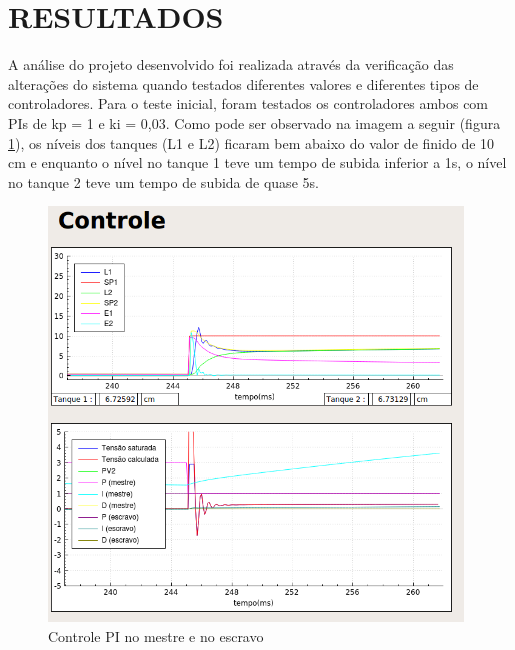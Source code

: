 \documentclass[a4paper,12pt]{article}
\begin{document}
\newpage


\thispagestyle{main}

\section{RESULTADOS}

\hspace{4ex}A análise do projeto desenvolvido foi realizada através da verificação das alterações do sistema quando testados diferentes valores e diferentes tipos de controladores.
Para o teste inicial, foram testados os controladores ambos com PIs de kp = 1 e ki = 0,03. Como pode ser observado na imagem a seguir (figura \ref{img1}), os níveis dos tanques (L1 e L2) ficaram bem abaixo do valor de finido de 10 cm e enquanto o nível no tanque 1 teve um tempo de subida inferior a 1s, o nível no tanque 2 teve um tempo de subida de quase 5s.

\begin{figure}[!h]
\centering
\includegraphics[width=11cm]{ImagensLab4/1.png}
\caption{Controle PI no mestre e no escravo}
\label{img1}
\end{figure}
\end{document}
